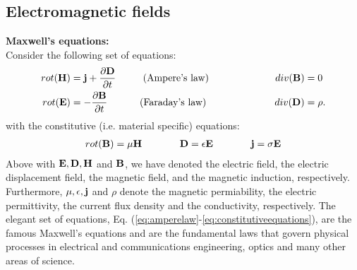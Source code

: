 \documentclass[11pt,a4paper]{report}
\def\bm{\ensuremath\mathbf}
\begin{document}
\subsection{Electromagnetic fields}
\textbf{Maxwell's equations:} 
\\
Consider the following set of equations: 
\begin{alignat}{3}
  rot ( \bm{H} ) &= \bm{j}+\frac{\partial \bm{D}}{\partial t} &\hspace{0.5cm} &\text{ (Ampere's law)} &\hspace{2cm} div (\bm{B}) &= 0 \label{eq:amperelaw}\\
  rot ( \bm{E} ) &= -\frac{\partial \bm{B}}{\partial t} &\hspace{0.5cm} &\text{(Faraday's law)} &\hspace{2cm} div (\bm{D}) &= \rho \label{eq:faradaylaw}. 
\end{alignat}
with the constitutive (i.e. material specific) equations: 
\begin{alignat}{3}
  \label{eq:constitutiveequations}
   rot  ( \bm{B} ) &= \mu \bm{H} &\hspace{1cm}  \bm{D} &= \epsilon \bm{E} &\hspace{1cm}  \bm{j} &= \sigma \bm{E} \\
\end{alignat}
Above with $\bm{E},\bm{D}, \bm{H}$ and $\bm{B}$, we have denoted the electric field, the electric displacement field, the magnetic field, and the magnetic induction, respectively. Furthermore, $\mu ,\epsilon ,\bm{j} $ and $\rho$ denote the magnetic permiability, the electric permittivity, the current flux density and the conductivity, respectively. The elegant set of equations, Eq. (\ref{eq:amperelaw}-\ref{eq:constitutiveequations}), are the famous Maxwell's equations and are the fundamental laws that govern physical processes in electrical and communications engineering, optics and many other areas of science.\\
\end{document}
